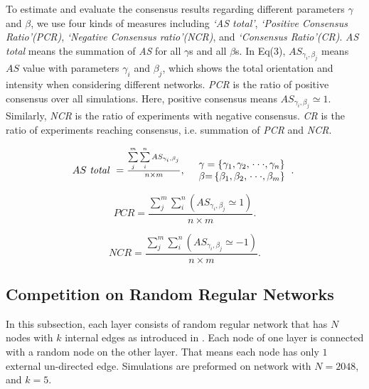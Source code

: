 \documentclass[english]{cccconf}
\begin{document}
To estimate and evaluate the consensus results regarding different parameters $\gamma$ and $\beta$, we use four kinds of measures including \textit{`AS total'}, \textit{`Positive Consensus Ratio'(PCR)}, \textit{`Negative Consensus ratio'(NCR)}, and \textit{`Consensus Ratio'(CR)}. \textit{AS total} means the summation of \textit{AS} for all $\gamma$s and all $\beta$s. In Eq(3), ${A{S_{{\gamma _i},{\beta _j}}}}$ means $AS$ value with parameters $\gamma_i$ and $\beta_j$, which shows the total orientation and intensity when considering different networks. \textit{PCR} is the ratio of positive consensus over all simulations. Here, positive consensus means  ${A{S_{{\gamma _i},{\beta _j}}} \simeq  1}$. Similarly, \textit{NCR} is the ratio of experiments with negative consensus. \textit{CR} is the ratio of experiments reaching consensus, i.e. summation of \textit{PCR} and \textit{NCR}.

\begin{equation}
\begin{array}{cl}
AS\mbox{ \textit{total} } = \frac{{\sum\limits_j^m {\sum\limits_i^n {A{S_{{\gamma _i},{\beta _j}}}} } }}{{n \times m }}, &
\begin{array}{l}
\gamma  = \left\{ {{\gamma _{\rm{1}}},{\gamma _{\rm{2}}},\left. {\cdot\cdot\cdot,{\gamma _n}} \right\}} \right.\\
\beta {\rm{ = }}\left\{ {{\beta _{\rm{1}}},{\beta _{\rm{2}}},\left. {\cdot\cdot\cdot,{\beta _m}} \right\}} \right.
\end{array}.\
\end{array}
\end{equation}

\begin{equation}
PCR = \frac{{\sum\limits_j^m {\sum\limits_i^n {(A{S_{{\gamma _i},{\beta _j}}} \simeq  1)} } }}{{n \times m}}.
\end{equation}

\begin{equation}
NCR = \frac{{\sum\limits_j^m {\sum\limits_i^n {(A{S_{{\gamma _i},{\beta _j}}} \simeq   - 1)} } }}{{n \times m}}.
\end{equation}

\subsection{Competition on Random Regular Networks}
In this subsection, each layer consists of random regular network that has $N$ nodes with $k$ internal edges as introduced in \cite{kimsangwoo2012, bela2001}. Each node of one layer is connected with a random node on the other layer. That means each node has only $1$ external un-directed edge. Simulations are preformed on network with $N=2048$, and $k = 5$. 
\end{document}
